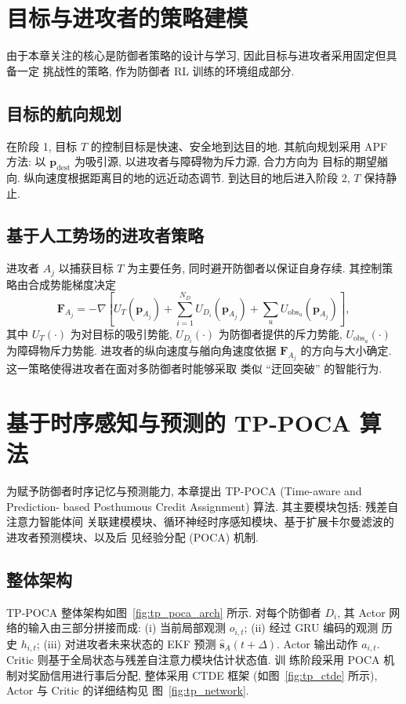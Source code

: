 \section{目标与进攻者的策略建模}
\label{sec:target_attacker_ctrl}
由于本章关注的核心是防御者策略的设计与学习, 因此目标与进攻者采用固定但具备一定
挑战性的策略, 作为防御者 RL 训练的环境组成部分.

\subsection{目标的航向规划}
\label{subsec:target_nav}
在阶段 1, 目标 $T$ 的控制目标是快速、安全地到达目的地. 其航向规划采用 APF 方法:
以 $\mathbf{p}_{\mathrm{dest}}$ 为吸引源, 以进攻者与障碍物为斥力源, 合力方向为
目标的期望艏向. 纵向速度根据距离目的地的远近动态调节. 到达目的地后进入阶段 2,
$T$ 保持静止.

\subsection{基于人工势场的进攻者策略}
\label{subsec:attacker_apf}
进攻者 $A_j$ 以捕获目标 $T$ 为主要任务, 同时避开防御者以保证自身存续. 其控制策
略由合成势能梯度决定
\begin{equation}
\mathbf{F}_{A_j} = -\nabla\!\left[U_T(\mathbf{p}_{A_j}) + \sum_{i=1}^{N_D} U_{D_i}(\mathbf{p}_{A_j}) + \sum_u U_{\mathrm{obs}_u}(\mathbf{p}_{A_j})\right],
\label{eq:attacker_apf}
\end{equation}
其中 $U_T(\cdot)$ 为对目标的吸引势能, $U_{D_i}(\cdot)$ 为防御者提供的斥力势能,
$U_{\mathrm{obs}_u}(\cdot)$ 为障碍物斥力势能. 进攻者的纵向速度与艏向角速度依据
$\mathbf{F}_{A_j}$ 的方向与大小确定. 这一策略使得进攻者在面对多防御者时能够采取
类似 ``迂回突破'' 的智能行为.

\section{基于时序感知与预测的 TP-POCA 算法}
\label{sec:tp_poca}

为赋予防御者时序记忆与预测能力, 本章提出 TP-POCA (Time-aware and Prediction-
based Posthumous Credit Assignment) 算法. 其主要模块包括: 残差自注意力智能体间
关联建模模块、循环神经时序感知模块、基于扩展卡尔曼滤波的进攻者预测模块、以及后
见经验分配 (POCA) 机制.

\subsection{整体架构}
\label{subsec:tp_poca_arch}
TP-POCA 整体架构如图~\ref{fig:tp_poca_arch} 所示. 对每个防御者 $D_i$, 其 Actor
网络的输入由三部分拼接而成: (i) 当前局部观测 $o_{i,t}$; (ii) 经过 GRU 编码的观测
历史 $h_{i,t}$; (iii) 对进攻者未来状态的 EKF 预测 $\hat{\mathbf{s}}_{A}(t+\Delta)$.
Actor 输出动作 $a_{i,t}$. Critic 则基于全局状态与残差自注意力模块估计状态值. 训
练阶段采用 POCA 机制对奖励信用进行事后分配, 整体采用 CTDE 框架
(如图~\ref{fig:tp_ctde} 所示), Actor 与 Critic 的详细结构见
图~\ref{fig:tp_network}.

